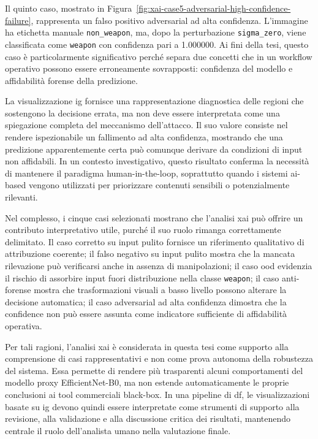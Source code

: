Il quinto caso, mostrato in
Figura~\ref{fig:xai-case5-adversarial-high-confidence-failure}, rappresenta un
falso positivo adversarial ad alta confidenza. L'immagine ha etichetta manuale
\texttt{non\_weapon}, ma, dopo la perturbazione \texttt{sigma\_zero}, viene
classificata come \texttt{weapon} con confidenza pari a 1.000000. Ai fini della
tesi, questo caso è particolarmente significativo perché separa due concetti che
in un workflow operativo possono essere erroneamente sovrapposti: confidenza
del modello e affidabilità forense della predizione.

La visualizzazione \gls{ig} fornisce una rappresentazione diagnostica delle
regioni che sostengono la decisione errata, ma non deve essere interpretata come
una spiegazione completa del meccanismo dell'attacco. Il suo valore consiste nel
rendere ispezionabile un fallimento ad alta confidenza, mostrando che una
predizione apparentemente certa può comunque derivare da condizioni di input
non affidabili. In un contesto investigativo, questo risultato conferma la
necessità di mantenere il paradigma human-in-the-loop, soprattutto quando i
sistemi \gls{ai}-based vengono utilizzati per priorizzare contenuti sensibili o
potenzialmente rilevanti.

Nel complesso, i cinque casi selezionati mostrano che l'analisi \gls{xai} può
offrire un contributo interpretativo utile, purché il suo ruolo rimanga
correttamente delimitato. Il caso corretto su input pulito fornisce un riferimento
qualitativo di attribuzione coerente; il falso negativo su input pulito mostra che
la mancata rilevazione può verificarsi anche in assenza di manipolazioni; il caso
\gls{ood} evidenzia il rischio di assorbire input fuori distribuzione nella classe
\texttt{weapon}; il caso anti-forense mostra che trasformazioni visuali a basso
livello possono alterare la decisione automatica; il caso adversarial ad alta
confidenza dimostra che la confidence non può essere assunta come indicatore
sufficiente di affidabilità operativa.

Per tali ragioni, l'analisi \gls{xai} è considerata in questa tesi come supporto
alla comprensione di casi rappresentativi e non come prova autonoma della
robustezza del sistema. Essa permette di rendere più trasparenti alcuni
comportamenti del modello proxy EfficientNet-B0, ma non estende automaticamente
le proprie conclusioni ai tool commerciali black-box. In una pipeline di
\gls{df}, le visualizzazioni basate su \gls{ig} devono quindi essere interpretate
come strumenti di supporto alla revisione, alla validazione e alla discussione
critica dei risultati, mantenendo centrale il ruolo dell'analista umano nella
valutazione finale.



